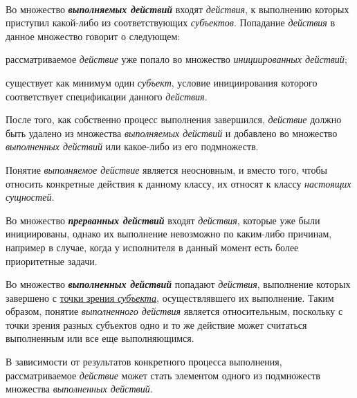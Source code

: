 \begin{frame}{}
 \\
 \bigskip
Во множество \textbf{\textit{выполняемых действий}} входят \textit{действия}, к выполнению которых приступил какой-либо из соответствующих \textit{субъектов}.
Попадание \textit{действия} в данное множество говорит о следующем:
\begin{textitemize}
	\item рассматриваемое \textit{действие} уже попало во множество \textit{инициированных действий};
	\item существует как минимум один \textit{субъект}, условие инициирования которого соответствует спецификации данного \textit{действия}.
\end{textitemize}

После того, как собственно процесс выполнения завершился, \textit{действие} должно быть удалено из множества \textit{выполняемых действий} и добавлено во множество \textit{выполненных действий} или какое-либо из его подмножеств.

Понятие \textit{выполняемое действие} является неосновным, и вместо того, чтобы относить конкретные действия к данному классу, их относят к классу \textit{настоящих сущностей}.
\end{frame}

\begin{frame}{}
Во множество \textbf{\textit{прерванных действий}} входят \textit{действия}, которые уже были инициированы, однако их выполнение невозможно по каким-либо причинам, например в случае, когда у исполнителя в данный момент есть более приоритетные задачи.

Во множество \textbf{\textit{выполненных действий}} попадают \textit{действия}, выполнение которых завершено с \uline{точки зрения \textit{субъекта}}, осуществлявшего их выполнение. Таким образом, понятие \textit{выполненного действия} является относительным, поскольку с точки зрения разных субъектов одно и то же действие может считаться выполненным или все еще выполняющимся.

В зависимости от результатов конкретного процесса выполнения, рассматриваемое \textit{действие} может стать элементом одного из подмножеств множества \textit{выполненных действий}.
\end{frame}

